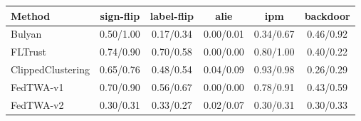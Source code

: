 \begin{tabular}{lccccc}
\toprule
Method & sign-flip & label-flip & alie & ipm & backdoor\\
\midrule
Bulyan & 0.50/1.00 & 0.17/0.34 & 0.00/0.01 & 0.34/0.67 & 0.46/0.92\\
FLTrust & 0.74/0.90 & 0.70/0.58 & 0.00/0.00 & 0.80/1.00 & 0.40/0.22\\
ClippedClustering & 0.65/0.76 & 0.48/0.54 & 0.04/0.09 & 0.93/0.98 & 0.26/0.29\\
FedTWA-v1 & 0.70/0.90 & 0.56/0.67 & 0.00/0.00 & 0.78/0.91 & 0.43/0.59\\
FedTWA-v2 & 0.30/0.31 & 0.33/0.27 & 0.02/0.07 & 0.30/0.31 & 0.30/0.33\\
\bottomrule
\end{tabular}
